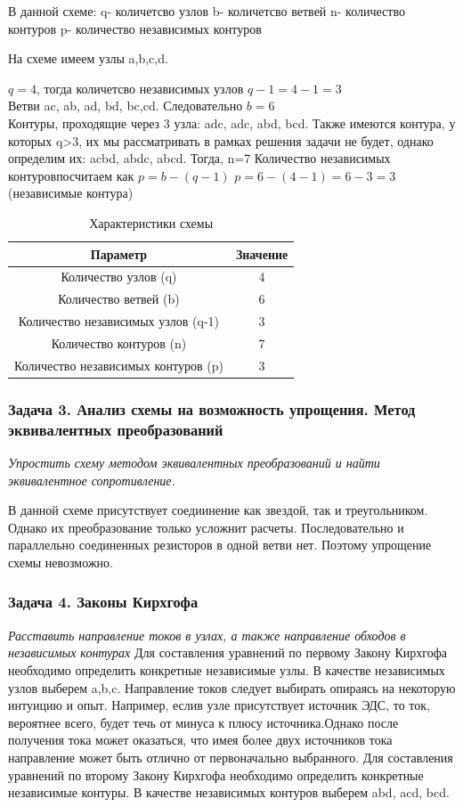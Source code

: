 В данной схеме:
q- количетсво узлов 
b- количетсво ветвей
n- количество контуров
p- количество независимых контуров

На схеме имеем узлы a,b,c,d. 

$q = 4$, тогда количетсво независимых узлов $q-1 = 4-1 = 3$ \\


Ветви ac, ab, ad, bd, bc,cd. Следовательно $b = 6$ \\

Контуры, проходящие через 3 узла: adc, adc, abd, bcd.
Также имеются контура, у которых q>3, их мы рассматривать в рамках решения задачи не будет, однако определим их:
acbd, abdc, abcd.
Тогда, n=7
Количество независимых контуровпосчитаем как
$p = b -(q-1)$ 
$p = 6-(4-1) = 6-3 = 3$ (независимые контура)


\begin{table}[H]
\centering
\begin{tabular}{|c|c|}
\hline
\textbf{Параметр} & \textbf{Значение} \\
\hline
Количество узлов (q) & 4 \\
\hline
Количество ветвей (b) & 6 \\
\hline
Количество независимых узлов (q-1) & 3 \\
\hline
Количество контуров (n) & 7 \\
\hline
Количество независимых контуров (p) & 3 \\
\hline
\end{tabular}
\caption{Характеристики схемы}
\label{tab:circuit_characteristics}
\end{table}


\subsubsection{Задача 3. Анализ схемы на возможность упрощения. Метод эквивалентных преобразований}
\textit{Упростить схему методом эквивалентных преобразований и найти эквивалентное сопротивление.}

В данной схеме присутствует соедиинение как звездой, так и треугольником. Однако их преобразование только усложнит расчеты. Последовательно и параллельно соединенных резисторов в одной ветви нет. Поэтому упрощение схемы невозможно.


\subsubsection{Задача 4. Законы Кирхгофа}
\textit{Расставить направление токов в узлах, а также направление обходов в независимых контурах}
Для составления уравнений по первому Закону Кирхгофа необходимо определить конкретные независимые узлы.
В качестве независимых узлов выберем a,b,c.
Направление токов следует выбирать опираясь на некоторую интуицию и опыт. Например, еслив  узле присутствует источник ЭДС, то ток, вероятнее всего, будет течь от минуса к плюсу источника.Однако после получения тока может оказаться, что имея более двух источников тока направление может быть отлично от первоначально выбранного.
Для составления уравнений по второму Закону Кирхгофа необходимо определить конкретные независимые контуры.
В качестве независимых контуров выберем abd, acd, bcd. 

